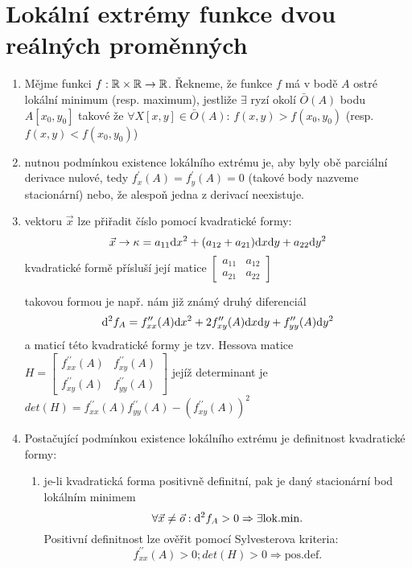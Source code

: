 \section{Lokální extrémy funkce dvou reálných proměnných}

\begin{enumerate}

\item Mějme funkci $f:\mathbb{R} \times \mathbb{R} \rightarrow \mathbb{R}$. Řekneme, že funkce $f$ má v bodě $A$ ostré lokální minimum (resp. maximum), jestliže $\exists$ ryzí okolí $\bar{O}(A)$ bodu $A[x_0,y_0]$ takové že $\forall X[x,y]  \in \bar{O}(A)$: $f(x,y) > f(x_0,y_0)$ (resp. $f(x,y) < f(x_0,y_0)$)

\item nutnou podmínkou existence lokálního extrému je, aby byly obě parciální derivace nulové, tedy $f^\prime_x (A) = f^\prime_y (A) = 0$ (takové body nazveme stacionární) nebo, že alespoň jedna z derivací neexistuje. 

\item vektoru $\vec{x}$ lze přiřadit číslo pomocí kvadratické formy: 
$$
\vec{x} \rightarrow \kappa = a_{11}\mathrm{d} x^2 + (a_{12} + a_{21}) \mathrm{d} x \mathrm{d} y + a_{22}\mathrm{d} y^2
$$
kvadratické formě přísluší její matice 
$
\left[
\begin{matrix}
a_{11} & a_{12} \\
a_{21} & a_{22}
\end{matrix}
\right]
$

takovou formou je např. nám již známý druhý diferenciál
$$
\mathrm{d}^2f_A = f^{\prime\prime}_{xx}(A) \mathrm{d} x^2
        +2f^{\prime\prime}_{xy}(A) \mathrm{d} x \mathrm{d} y
        + f^{\prime\prime}_{yy}(A) \mathrm{d} y^2
$$
a maticí této kvadratické formy je tzv. Hessova matice
$
H=
\left[
\begin{matrix}
f^{\prime\prime}_{xx}(A) & f^{\prime\prime}_{xy}(A) \\
f^{\prime\prime}_{xy}(A) & f^{\prime\prime}_{yy}(A) 
\end{matrix}
\right]
$
jejíž determinant je
$
det(H)=f^{\prime\prime}_{xx}(A) f^{\prime\prime}_{yy}(A)
     - \left(f^{\prime\prime}_{xy}(A)\right)^2
$

\item Postačující podmínkou existence lokálního extrému je definitnost kvadratické formy:
\begin{enumerate}
\item je-li kvadratická forma positivně definitní, pak je daný stacionární bod lokálním minimem
$$
\forall \vec{x} \neq \vec{o} :
\mathrm{d}^2f_A > 0 
\Rightarrow \exists \mathrm{lok.min.}
$$
Positivní definitnost lze ověřit pomocí Sylvesterova kriteria: 
$$
f^{\prime\prime}_{xx}(A) > 0; det(H) > 0
\Rightarrow \mathrm{pos.def.}
$$


\end{enumerate}
\end{enumerate}
